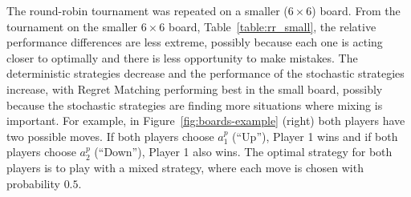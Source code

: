 \documentclass{article}
\begin{document}
%
The round-robin tournament was repeated on a smaller ($6 \times 6$) board. 
From the tournament on the smaller $6 \times 6$ board, Table~\ref{table:rr_small}, 
the relative performance differences are less extreme, possibly
because each one is acting closer to optimally and there is less opportunity to make mistakes.
The deterministic strategies decrease and the performance of the stochastic strategies increase, with Regret Matching 
performing best in the small board, possibly because the stochastic strategies are finding more situations where mixing 
is important. 
For example, in Figure~\ref{fig:boards-example} (right) both players have two possible moves. If both players 
choose $a^{p}_{1}$ (``Up''), Player 1 wins and if both players choose $a^{p}_{2}$ (``Down''), Player 1 also wins. 
The optimal strategy for both players is to play with a mixed strategy, where each move is chosen with probability $0.5$. 


\end{document}
